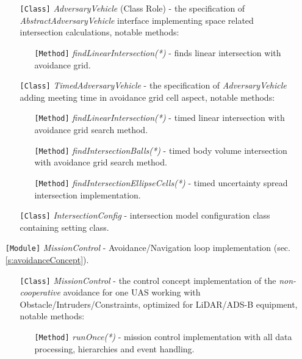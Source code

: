 \begin{itemize}
\begin{itemize}
        \item[\texttt{[Class]}] \emph{AdversaryVehicle} (Class Role) - the specification of \emph{AbstractAdversaryVehicle} interface implementing space related intersection calculations, notable methods:
        \begin{itemize}
            \item[\texttt{[Method]}] \emph{findLinearIntersection(*)} - finds linear intersection with avoidance grid.
        \end{itemize}
        
        \item[\texttt{[Class]}] \emph{TimedAdversaryVehicle} - the specification of \emph{AdversaryVehicle} adding meeting time in avoidance grid cell aspect, notable methods: 
        \begin{itemize}
            \item[\texttt{[Method]}] \emph{findLinearIntersection(*)} - timed linear intersection with avoidance grid search method.
            
            \item[\texttt{[Method]}] \emph{findIntersectionBalls(*)} - timed body volume intersection with avoidance grid search method.
            
            \item[\texttt{[Method]}] \emph{findIntersectionEllipseCells(*)} - timed uncertainty spread intersection implementation. 
        \end{itemize}
        
        \item[\texttt{[Class]}] \emph{IntersectionConfig} - intersection model configuration class containing setting class.
    \end{itemize}
    
    \item[\texttt{[Module]}] \emph{MissionControl} - Avoidance/Navigation loop implementation (sec. \ref{s:avoidanceConcept}).
    \begin{itemize}
        \item[\texttt{[Class]}] \emph{MissionControl} - the control concept implementation of the \emph{non-cooperative} avoidance for one UAS working with Obstacle/Intruders/Constraints, optimized for LiDAR/ADS-B equipment, notable methods:
        \begin{itemize}
            \item[\texttt{[Method]}] \emph{runOnce(*)} - mission control implementation with all data processing, hierarchies and event handling.
            

\end{itemize}
\end{itemize}
\end{itemize}

